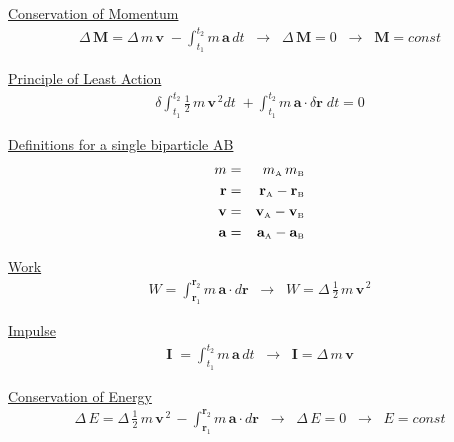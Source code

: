\documentclass[11pt,fleqn]{article}
\begin{document}
\medskip

{\underline {Conservation of Momentum}}
\medskip
\begin{eqnarray*}
\Delta \, \mathbf{M} = \Delta \, m \, \mathbf{v} \; - \int_{t_1}^{t_2} m \, \mathbf{a} \, dt \; \; \rightarrow \; \; \Delta \, \mathbf{M} = 0 \; \; \rightarrow \; \; \mathbf{M} = const
\end{eqnarray*}

\medskip

{\underline {Principle of Least Action}}
\medskip
\begin{eqnarray*}
\delta \int_{t_1}^{t_2} {\textstyle \frac{1}{2}} \, m \, \mathbf{v}^{\, 2} dt \; + \int_{t_1}^{t_2} m \, \mathbf{a} \cdot \delta \mathbf{r} \; dt = 0
\end{eqnarray*}

\newpage

{\underline {Definitions for a single biparticle AB}}
\medskip
\begin{eqnarray*}
m & = & m_{\mbox {\tiny A}} \, m_{\mbox {\tiny B}} \\
\mathbf{r} & = & \mathbf{r}_{\mbox {\tiny A}} - \mathbf{r}_{\mbox {\tiny B}} \\
\mathbf{v} & = & \mathbf{v}_{\mbox {\tiny A}} - \mathbf{v}_{\mbox {\tiny B}} \\
\mathbf{a} & = & \mathbf{a}_{\mbox {\tiny A}} - \mathbf{a}_{\mbox {\tiny B}}
\end{eqnarray*}

\medskip

{\underline {Work}}
\medskip
\begin{eqnarray*}
W = \int_{\mathbf{r}_1}^{\mathbf{r}_2} m \, \mathbf{a} \cdot d\mathbf{r} \; \; \rightarrow \; \; W = \Delta \, {\textstyle \frac{1}{2}} \, m \, \mathbf{v}^{\, 2}
\end{eqnarray*}

\medskip

{\underline {Impulse}}
\medskip
\begin{eqnarray*}
\mathbf{I} \; = \int_{t_1}^{t_2} m \, \mathbf{a} \, dt \; \; \rightarrow \; \; \mathbf{I} = \Delta \, m \, \mathbf{v}
\end{eqnarray*}

\medskip

{\underline {Conservation of Energy}}
\medskip
\begin{eqnarray*}
\Delta \, E = \Delta \, {\textstyle \frac{1}{2}} \, m \, \mathbf{v}^{\, 2} \, - \int_{\mathbf{r}_1}^{\mathbf{r}_2} m \, \mathbf{a} \cdot d\mathbf{r} \; \; \rightarrow \; \; \Delta \, E = 0 \; \; \rightarrow \; \; E = const
\end{eqnarray*}
\end{document}
